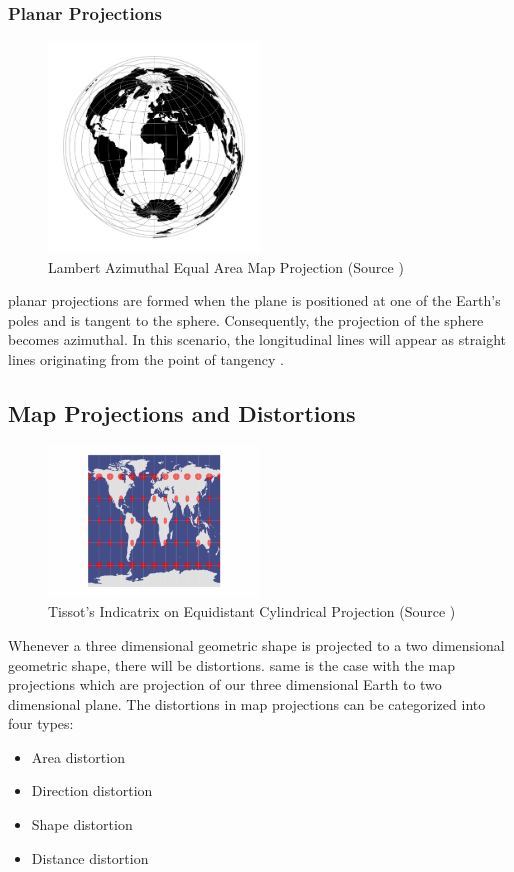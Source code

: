 \subsubsection{Planar Projections}

\begin{figure}[H]
    \centering
    \includegraphics[width=0.5\textwidth]{figures/chapter-3/laea.png}
    \caption{Lambert Azimuthal Equal Area Map Projection (Source \cite{PROJ_SITE})}
    \label{fig:laea-image}
\end{figure}

planar projections are formed when the plane is positioned at one of the Earth's poles and is tangent to the sphere. Consequently, the projection of the sphere becomes azimuthal. In this scenario, the longitudinal lines will appear as straight lines originating from the point of tangency \cite{Snyder1982}.


\subsection{Map Projections and Distortions}
\begin{figure}[H]
    \centering
    \includegraphics[width=0.5\textwidth]{figures/chapter-3/Tissot-Equidistant-Cylindrical-1-678x486.png}
    \caption{Tissot's Indicatrix on Equidistant Cylindrical Projection (Source \cite{GISGEO_Tissot})}
    \label{fig:tissot-image}
\end{figure}
Whenever a three dimensional geometric shape is projected to a two dimensional geometric shape, there will be distortions. same is the case with the map projections which are projection of our three dimensional Earth to two dimensional plane.
The distortions in map projections can be categorized into four types:
\begin{itemize}
    \item Area distortion
    \item Direction distortion
    \item Shape distortion
    \item Distance distortion
\end{itemize}

